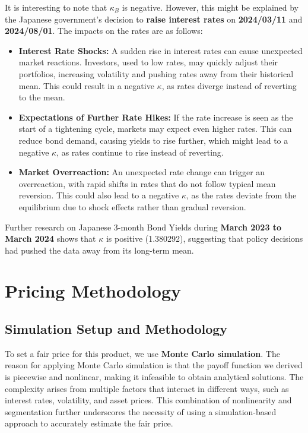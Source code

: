 \documentclass[a4paper, twocolumn]{article}
\begin{document}
It is interesting to note that $\kappa_B$ is negative. However, this might be explained by the Japanese government's decision to \textbf{raise interest rates} on \textbf{2024/03/11} and \textbf{2024/08/01}. The impacts on the rates are as follows:

\begin{itemize}

    \item \textbf{Interest Rate Shocks:} A sudden rise in interest rates can cause unexpected market reactions. Investors, used to low rates, may quickly adjust their portfolios, increasing volatility and pushing rates away from their historical mean. This could result in a negative $\kappa$, as rates diverge instead of reverting to the mean.
    
    \item \textbf{Expectations of Further Rate Hikes:} If the rate increase is seen as the start of a tightening cycle, markets may expect even higher rates. This can reduce bond demand, causing yields to rise further, which might lead to a negative $\kappa$, as rates continue to rise instead of reverting.
    
    \item \textbf{Market Overreaction:} An unexpected rate change can trigger an overreaction, with rapid shifts in rates that do not follow typical mean reversion. This could also lead to a negative $\kappa$, as the rates deviate from the equilibrium due to shock effects rather than gradual reversion.
    
\end{itemize}

Further research on Japanese 3-month Bond Yields during \textbf{March 2023 to March 2024} shows that $\kappa$ is positive (1.380292), suggesting that policy decisions had pushed the data away from its long-term mean.

\section{Pricing Methodology}

\subsection{Simulation Setup and Methodology}

To set a fair price for this product, we use \textbf{Monte Carlo simulation}. The reason for applying Monte Carlo simulation is that the payoff function we derived is piecewise and nonlinear, making it infeasible to obtain analytical solutions. The complexity arises from multiple factors that interact in different ways, such as interest rates, volatility, and asset prices. This combination of nonlinearity and segmentation further underscores the necessity of using a simulation-based approach to accurately estimate the fair price.
\end{document}
